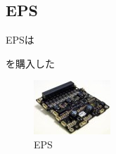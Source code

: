 \subsection{EPS}
EPSは

を購入した
\begin{figure}[htbp]
	\begin{center}
		\includegraphics[width=0.5\linewidth]{./03/fig/eps.jpg}
		\caption{EPS}
		\label{eps}
	\end{center}
\end{figure}
